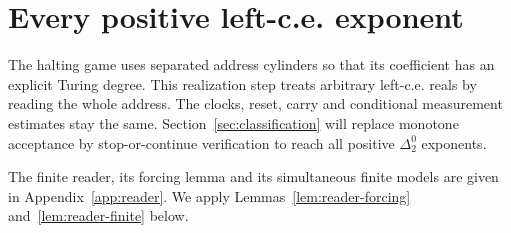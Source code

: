 \section{Every positive left-c.e. exponent}\label{sec:realization}
The halting game uses separated address cylinders so that its coefficient has an explicit Turing degree. This realization step treats arbitrary left-c.e. reals by reading the whole address. The clocks, reset, carry and conditional measurement estimates stay the same. Section~\ref{sec:classification} will replace monotone acceptance by stop-or-continue verification to reach all positive $\Delta^0_2$ exponents.

The finite reader, its forcing lemma and its simultaneous finite models are given in Appendix~\ref{app:reader}. We apply Lemmas~\ref{lem:reader-forcing} and~\ref{lem:reader-finite} below.
\setcounter{theorem}{2}
\setcounter{equation}{7}

